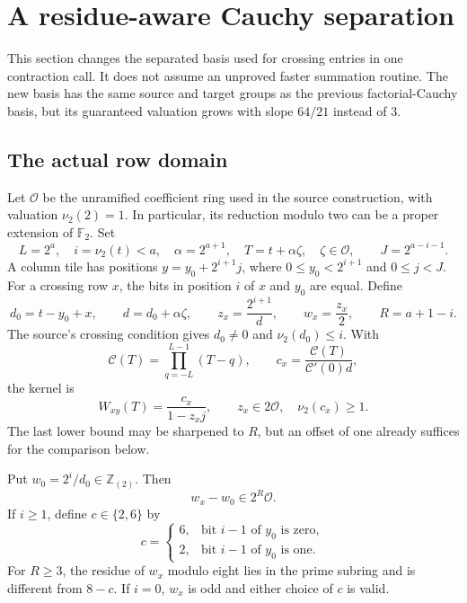 \section{A residue-aware Cauchy separation}
\label{sec:pivot21}

This section changes the separated basis used for crossing entries in one
contraction call. It does not assume an unproved faster summation routine.
The new basis has the same source and target groups as the previous
factorial-Cauchy basis, but its guaranteed valuation grows with slope
$64/21$ instead of $3$.

\subsection{The actual row domain}

Let $\mathcal O$ be the unramified coefficient ring used in the source
construction, with valuation $\nu_2(2)=1$. In particular, its reduction
modulo two can be a proper extension of $\mathbb F_2$. Set
\[
 L=2^a,\quad i=\nu_2(t)<a,\quad
 \alpha=2^{a+1},\quad T=t+\alpha\zeta,\quad \zeta\in\mathcal O,
 \qquad J=2^{a-i-1}.
\]
A column tile has positions
$y=y_0+2^{i+1}j$, where $0\le y_0<2^{i+1}$ and $0\le j<J$.
For a crossing row $x$, the bits in position $i$ of $x$ and $y_0$
are equal. Define
\[
 d_0=t-y_0+x,\qquad d=d_0+\alpha\zeta,\qquad
 z_x=\frac{2^{i+1}}{d},\qquad w_x=\frac{z_x}{2},
 \qquad R=a+1-i.
\]
The source's crossing condition gives $d_0\ne0$ and
$\nu_2(d_0)\le i$. With
\[
 \mathscr C(T)=\prod_{q=-L}^{L-1}(T-q),\qquad
 c_x=\frac{\mathscr C(T)}{\mathscr C'(0)d},
\]
the kernel is
\begin{equation}
 W_{xy}(T)=\frac{c_x}{1-z_xj},
 \qquad z_x\in2\mathcal O,\quad \nu_2(c_x)\ge1.
 \label{eq:pivot21-kernel}
\end{equation}
The last lower bound may be sharpened to $R$, but an offset of one
already suffices for the comparison below.

\begin{lemma}
\label{lem:pivot21-domain}
Put $w_0=2^i/d_0\in\mathbb Z_{(2)}$. Then
\[
 w_x-w_0\in2^R\mathcal O.
\]
If $i\ge1$, define $c\in\{2,6\}$ by
\[
 c=\begin{cases}
       6,&\text{bit }i-1\text{ of }y_0\text{ is zero},\\
       2,&\text{bit }i-1\text{ of }y_0\text{ is one}.
    \end{cases}
\]
For $R\ge3$, the residue of $w_x$ modulo eight lies in the prime
subring and is different from $8-c$. If $i=0$, $w_x$ is odd and
either choice of $c$ is valid.
\end{lemma}

